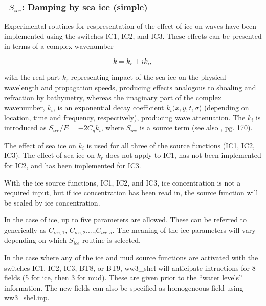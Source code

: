 \vsssub
\subsubsection{~$S_{ice}$: Damping by sea ice (simple)} \label{sec:ICE1}
\vsssub


\noindent
Experimental routines for respresentation of the effect of ice on waves have
been implemented using the switches {\code IC1}, {\code IC2}, and {\code
IC3}. These effects can be presented in terms of a complex wavenumber

\begin{equation}\label{eq:waveno}
     {k} = {k_r} + i{k_i},
\end{equation}

\noindent
with the real part ${k_r}$ representing impact of the sea ice on the physical
wavelength and propagation speeds, producing effects analogous to shoaling and
refraction by bathymetry, whereas the imaginary part of the complex
wavenumber, ${k_i}$, is an exponential decay coefficient
${k_i}({x},{y},{t},\sigma $) (depending on location, time and frequency,
respectively), producing wave attenuation.  The ${k_i}$ is introduced as
${S_{ice}}/{E}=-2{C_g}{k_i}$, where ${S_{ice}}$ is a source term (see also
\cite{bk:WAM94}, pg. 170).

The effect of sea ice on ${k_i}$ is used for all three of the source functions
({\code IC1}, {\code IC2}, {\code IC3}). The effect of sea ice on ${k_r}$ does
not apply to {\code IC1}, has not been implemented for {\code IC2}, and has
been implemented for {\code IC3}.

With the ice source functions, {\code IC1}, {\code IC2}, and {\code IC3}, ice
concentration is not a required input, but if ice concentration has been read
in, the source function will be scaled by ice concentration.

In the case of ice, up to five parameters are allowed. These can be referred
to generically as ${C_{ice,1}}$, ${C_{ice,2}}$,...,${C_{ice,5}}$.  The meaning
of the ice parameters will vary depending on which ${S_{ice}}$ routine is
selected.

In the case where any of the ice and mud source functions are activated with
the switches {\code IC1}, {\code IC2}, {\code IC3}, {\code BT8}, or {\code
BT9}, {\file ww3\_shel} will anticipate intructions for 8 fields (5 for ice,
then 3 for mud). These are given prior to the ``water levels'' information.
The new fields can also be specified as homogeneous field using {\file
ww3\_shel.inp}.

